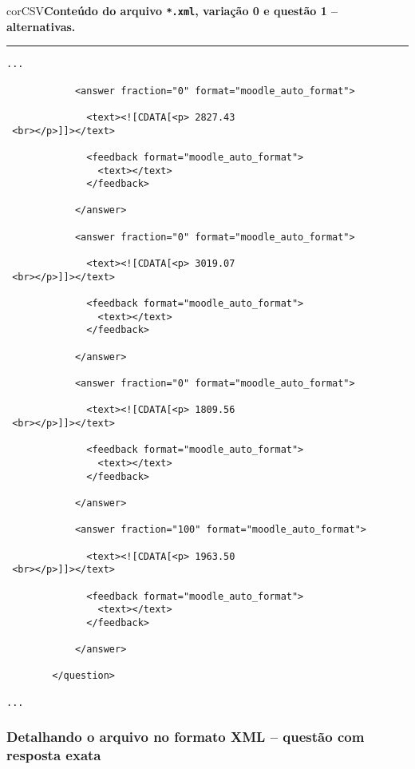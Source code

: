 \begin{myboxCode}{corCSV}{\textbf{Conteúdo do arquivo \texttt{*.xml}, variação 0 e questão 1 -- alternativas.}}\vspace{3mm}
\hrule
{\scriptsize
\begin{verbatim}
...

            <answer fraction="0" format="moodle_auto_format">
            
              <text><![CDATA[<p> 2827.43
 <br></p>]]></text>
            
              <feedback format="moodle_auto_format">
                <text></text>
              </feedback>
              
            </answer>
        
            <answer fraction="0" format="moodle_auto_format">
            
              <text><![CDATA[<p> 3019.07
 <br></p>]]></text>
 
              <feedback format="moodle_auto_format">
                <text></text>
              </feedback>
              
            </answer>
        
            <answer fraction="0" format="moodle_auto_format">
            
              <text><![CDATA[<p> 1809.56
 <br></p>]]></text>
 
              <feedback format="moodle_auto_format">
                <text></text>
              </feedback>
              
            </answer>
        
            <answer fraction="100" format="moodle_auto_format">
            
              <text><![CDATA[<p> 1963.50
 <br></p>]]></text>
 
              <feedback format="moodle_auto_format">
                <text></text>
              </feedback>
              
            </answer>
        
        </question>
        
...
\end{verbatim}
}
\end{myboxCode}

\subsubsection{Detalhando o arquivo no formato XML -- questão com resposta exata}


